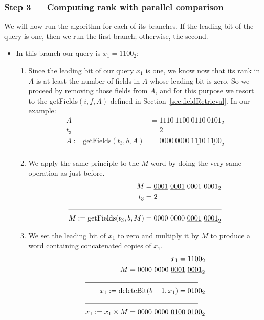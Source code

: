 \subsubsection{Step 3 --- Computing rank with parallel comparison}

We will now run the algorithm for each of its branches. If the leading bit of the query is one, then we run the first branch; otherwise, the second.
\begin{itemize}
    \item
    In this branch our query is $x_1 = 1100_2$:
    \begin{enumerate}
        \item
        Since the leading bit of our query $x_1$ is one, we know now that its rank in $A$ is at least the number of fields in $A$ whose leading bit is zero. So we proceed by removing those fields from $A$, and for this purpose we resort to the getFields$(i, f, A)$ defined in Section~\ref{sec:fieldRetrieval}. In our example:
        \begin{align*}
            A &= \underline{1110}\ \underline{1100}\ 0110\ 0101_2 \\
            t_3 &= 2 \\
            A := \text{getFields}(t_3, b, A) &= 0000\ 0000\ \underline{1110}\ \underline{1100}_2 \\
        \end{align*}
        
        \item
        We apply the same principle to the $M$ word by doing the very same operation as just before.
        \begin{align*}
            M &= \underline{0001}\ \underline{0001}\ 0001\ 0001_2 \\
            t_3 &= 2 \\
            \cline{1-2}
            M := \text{getFields}(t_3, b, M) &= 0000\ 0000\ \underline{0001}\ \underline{0001}_2 \\
        \end{align*}
        
        \item
        We set the leading bit of $x_1$ to zero and multiply it by $M$ to produce a word containing concatenated copies of $x_1$.
        \begin{align*}
            x_1 = 1100_2 \\
            M = 0000\ 0000\ \underline{0001}\ \underline{0001}_2 \\
            \cline{1-2}
            x_1 := \text{deleteBit}(b - 1, x_1) = 0100_2 \\
            \cline{1-2}
            x_1 := x_1 \times M = 0000\ 0000\ \underline{0100}\ \underline{0100}_2 \\
        \end{align*}
        

\end{enumerate}
\end{itemize}
